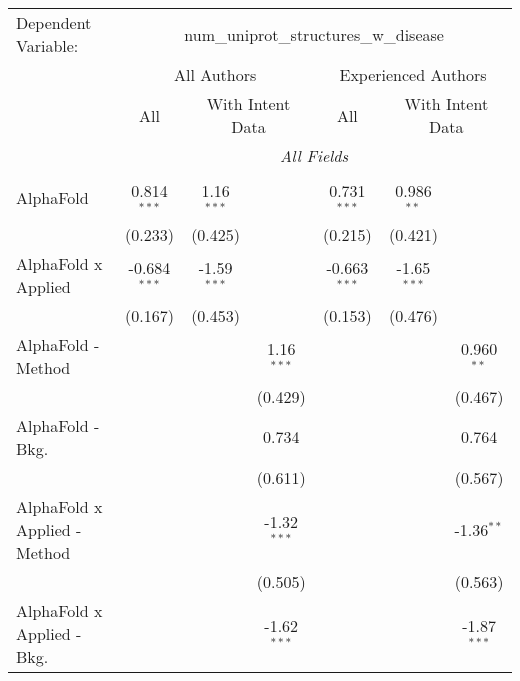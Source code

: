\begingroup
\centering
\begin{tabular}{lcccccc}
   \tabularnewline \midrule \midrule
   Dependent Variable: & \multicolumn{6}{c}{num\_uniprot\_structures\_w\_disease}\\
 & \multicolumn{3}{c}{All Authors} & \multicolumn{3}{c}{Experienced Authors} \\
\cmidrule(lr){2-4} \cmidrule(lr){5-7}
 & \multicolumn{1}{c}{All} & \multicolumn{2}{c}{With Intent Data} & \multicolumn{1}{c}{All} & \multicolumn{2}{c}{With Intent Data} \\
\cmidrule(lr){2-2} \cmidrule(lr){3-4} \cmidrule(lr){5-5} \cmidrule(lr){6-7}
 & \multicolumn{6}{c}{\textit{All Fields}} \\ \\
   AlphaFold                    & 0.814$^{***}$  & 1.16$^{***}$  &               & 0.731$^{***}$  & 0.986$^{**}$  &   \\   
                                & (0.233)        & (0.425)       &               & (0.215)        & (0.421)       &   \\   
   AlphaFold x Applied          & -0.684$^{***}$ & -1.59$^{***}$ &               & -0.663$^{***}$ & -1.65$^{***}$ &   \\   
                                & (0.167)        & (0.453)       &               & (0.153)        & (0.476)       &   \\   
   AlphaFold - Method           &                &               & 1.16$^{***}$  &                &               & 0.960$^{**}$\\   
                                &                &               & (0.429)       &                &               & (0.467)\\   
   AlphaFold - Bkg.             &                &               & 0.734         &                &               & 0.764\\   
                                &                &               & (0.611)       &                &               & (0.567)\\   
   AlphaFold x Applied - Method &                &               & -1.32$^{***}$ &                &               & -1.36$^{**}$\\   
                                &                &               & (0.505)       &                &               & (0.563)\\   
   AlphaFold x Applied - Bkg.   &                &               & -1.62$^{***}$ &                &               & -1.87$^{***}$\\   

\end{tabular}
